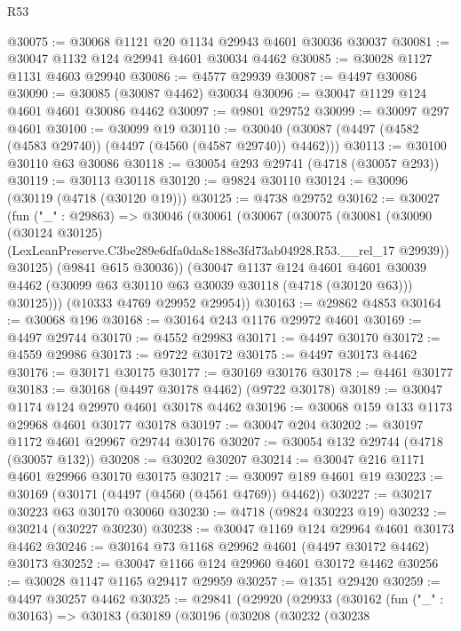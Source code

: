 \begin{lexlean}{R53}
\begin{coremodule}
@30075 := @30068 @1121 @20 @1134 @29943 @4601 @30036 @30037
@30081 := @30047 @1132 @124 @29941 @4601 @30034 @4462
@30085 := @30028 @1127 @1131 @4603 @29940
@30086 := @4577 @29939
@30087 := @4497 @30086
@30090 := @30085 (@30087 @4462) @30034
@30096 := @30047 @1129 @124 @4601 @4601 @30086 @4462
@30097 := @9801 @29752
@30099 := @30097 @297 @4601
@30100 := @30099 @19
@30110 := @30040 (@30087 (@4497 (@4582 (@4583 @29740)) (@4497 (@4560 (@4587 @29740)) @4462)))
@30113 := @30100 @30110 @63 @30086
@30118 := @30054 @293 @29741 (@4718 (@30057 @293))
@30119 := @30113 @30118
@30120 := @9824 @30110
@30124 := @30096 (@30119 (@4718 (@30120 @19)))
@30125 := @4738 @29752
@30162 := @30027
    (fun ("_" : @29863) =>
    @30046
      (@30061
        (@30067
          (@30075
            (@30081
              (@30090
                (@30124 @30125)
                (LexLeanPreserve.C3be289e6dfa0da8c188e3fd73ab04928.R53.__rel_17 @29939))
              @30125)
            (@9841 @615 @30036))
          (@30047
            @1137
            @124
            @4601
            @4601
            @30039
            @4462
            (@30099 @63 @30110 @63 @30039 @30118 (@4718 (@30120 @63)))
            @30125)))
      (@10333 @4769 @29952 @29954))
@30163 := @29862 @4853
@30164 := @30068 @196
@30168 := @30164 @243 @1176 @29972 @4601
@30169 := @4497 @29744
@30170 := @4552 @29983
@30171 := @4497 @30170
@30172 := @4559 @29986
@30173 := @9722 @30172
@30175 := @4497 @30173 @4462
@30176 := @30171 @30175
@30177 := @30169 @30176
@30178 := @4461 @30177
@30183 := @30168 (@4497 @30178 @4462) (@9722 @30178)
@30189 := @30047 @1174 @124 @29970 @4601 @30178 @4462
@30196 := @30068 @159 @133 @1173 @29968 @4601 @30177 @30178
@30197 := @30047 @204
@30202 := @30197 @1172 @4601 @29967 @29744 @30176
@30207 := @30054 @132 @29744 (@4718 (@30057 @132))
@30208 := @30202 @30207
@30214 := @30047 @216 @1171 @4601 @29966 @30170 @30175
@30217 := @30097 @189 @4601 @19
@30223 := @30169 (@30171 (@4497 (@4560 (@4561 @4769)) @4462))
@30227 := @30217 @30223 @63 @30170 @30060
@30230 := @4718 (@9824 @30223 @19)
@30232 := @30214 (@30227 @30230)
@30238 := @30047 @1169 @124 @29964 @4601 @30173 @4462
@30246 := @30164 @73 @1168 @29962 @4601 (@4497 @30172 @4462) @30173
@30252 := @30047 @1166 @124 @29960 @4601 @30172 @4462
@30256 := @30028 @1147 @1165 @29417 @29959
@30257 := @1351 @29420
@30259 := @4497 @30257 @4462
@30325 := @29841
    (@29920
      (@29933
        (@30162
          (fun ("_" : @30163) =>
          @30183
            (@30189
              (@30196
                (@30208
                  (@30232
                    (@30238

\end{coremodule}
\end{lexlean}
